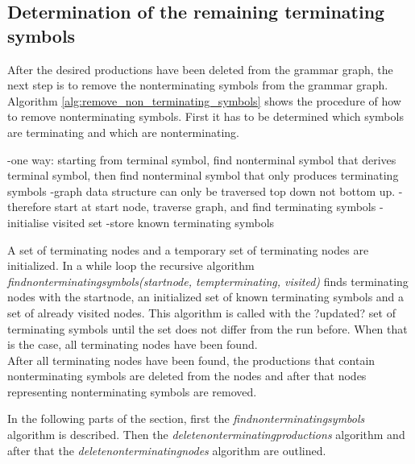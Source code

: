 \subsection{Determination of the remaining terminating symbols}

After the desired productions have been deleted from the grammar graph, the next step is to remove the nonterminating symbols from the grammar graph. Algorithm \ref{alg:remove_non_terminating_symbols} shows the procedure of how to remove nonterminating symbols.
First it has to be determined which symbols are terminating and which are nonterminating.

-one way: starting from terminal symbol, find nonterminal symbol that derives terminal symbol, then find nonterminal symbol that only produces terminating symbols
-graph data structure can only be traversed top down not bottom up.
-therefore start at start node, traverse graph, and find terminating symbols
-initialise visited set
-store known terminating symbols

A set of terminating nodes and a temporary set of terminating nodes are initialized.
In a while loop the recursive algorithm \textit{find\textunderscore non\textunderscore terminating\textunderscore symbols(start\textunderscore node, temp\textunderscore terminating, visited)} finds terminating nodes with the start\textunderscore node, an initialized set of known terminating symbols and a set of already visited nodes.
This algorithm is called with the ?updated? set of terminating symbols until the set does not differ from the run before.
When that is the case, all terminating nodes have been found.\\
After all terminating nodes have been found, the productions that contain nonterminating symbols are deleted from the nodes and after that nodes representing nonterminating symbols are removed.

In the following parts of the section, first the \textit{find\textunderscore non\textunderscore terminating\textunderscore symbols} algorithm is described. Then the \textit{delete\textunderscore non\textunderscore terminating\textunderscore productions} algorithm and after that the \textit{delete\textunderscore non\textunderscore terminating\textunderscore nodes} algorithm are outlined.

